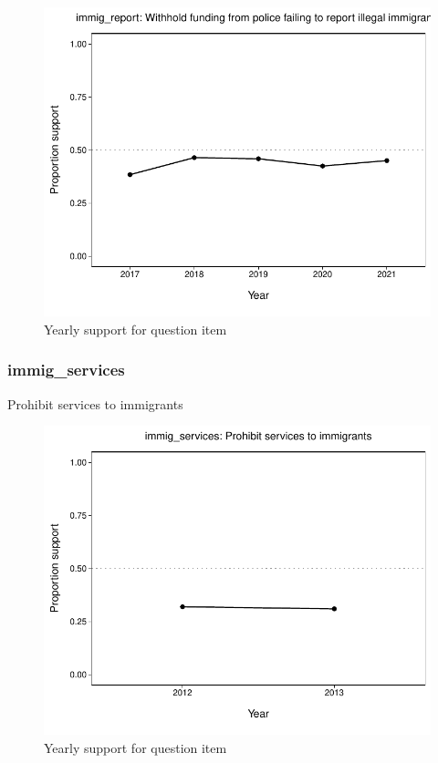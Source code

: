 \documentclass[
  12pt]{article}
\begin{document}
\begin{figure}

{\centering \includegraphics{error-checking_files/figure-latex/unnamed-chunk-3-26} 

}

\caption{Yearly support for question item}\label{fig:unnamed-chunk-3-26}
\end{figure}

\hypertarget{immig_services}{%
\subsubsection{immig\_services}\label{immig_services}}

Prohibit services to immigrants

\begin{figure}

{\centering \includegraphics{error-checking_files/figure-latex/unnamed-chunk-3-27} 

}

\caption{Yearly support for question item}\label{fig:unnamed-chunk-3-27}
\end{figure}
\end{document}
